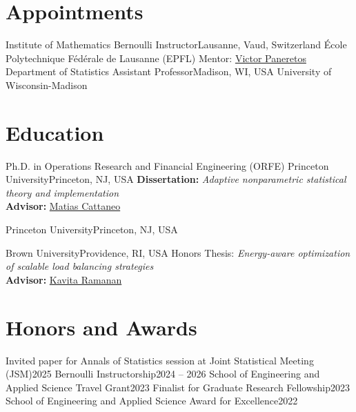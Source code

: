 \documentclass[10pt,a4paper,roman]{moderncv}        %
\begin{document}
\makecvtitle

\vspace{-1cm}
\section{Appointments}
{Institute of Mathematics}
{Bernoulli Instructor}{Lausanne, Vaud, Switzerland}
{École Polytechnique Fédérale de Lausanne (EPFL)}
{Mentor: \color{blue}\href{https://people.epfl.ch/victor.panaretos}{Victor Paneretos}}
{Department of Statistics}
{Assistant Professor}{Madison, WI, USA}
{University of Wisconsin-Madison}
{}
\vspace{-0.3cm}
\section{Education}
{Ph.D. in Operations Research and Financial Engineering (ORFE)}
{Princeton University}{Princeton, NJ, USA}{}
{\textbf{Dissertation:} \textit{Adaptive nonparametric statistical theory and implementation}
  \\
  \textbf{Advisor: }\color{blue}\href{https://cattaneo.princeton.edu}{Matias Cattaneo}\color{black}}

{Princeton University}{Princeton, NJ, USA}{}{}

{Brown University}{Providence, RI, USA}{}{ Honors Thesis: \textit{Energy-aware optimization of scalable load balancing
    strategies}
  \\
  \textbf{Advisor:}
  \color{blue}\href{https://www.brown.edu/academics/applied-mathematics/faculty/kavita-ramanan/home}
  {Kavita Ramanan}\color{black}}  %

\vspace{-0.3cm}
\section{Honors and Awards}
{Invited paper for Annals of Statistics session at Joint Statistical Meeting (JSM)}{2025}
{}{}
{Bernoulli Instructorship}{2024 -- 2026}
{}{}
{School of Engineering and Applied Science Travel Grant}{2023}
{}{}
{Finalist for Graduate Research Fellowship}{2023}
{}{}
{School of Engineering and Applied Science Award for Excellence}{2022}
{}{}
\end{document}
